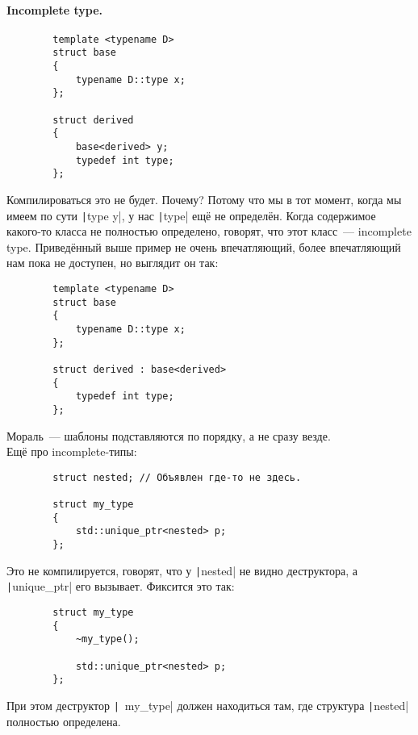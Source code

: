 \documentclass{article}
\begin{document}
    \paragraph{Incomplete type.}
    \begin{verbatim}
        template <typename D>
        struct base
        {
            typename D::type x;
        };

        struct derived
        {
            base<derived> y;
            typedef int type;
        };
    \end{verbatim}
    Компилироваться это не будет. Почему? Потому что мы в тот момент, когда мы имеем по сути \texttt|type y|, у нас \texttt|type| ещё не определён. Когда содержимое какого-то класса не полностью определено, говорят, что этот класс~--- incomplete type. Приведённый выше пример не очень впечатляющий, более впечатляющий нам пока не доступен, но выглядит он так:
    \begin{verbatim}
        template <typename D>
        struct base
        {
            typename D::type x;
        };

        struct derived : base<derived>
        {
            typedef int type;
        };
    \end{verbatim}
    Мораль~--- шаблоны подставляются по порядку, а не сразу везде.\\
    Ещё про incomplete-типы:
    \begin{verbatim}
        struct nested; // Объявлен где-то не здесь.

        struct my_type
        {
            std::unique_ptr<nested> p;
        };
    \end{verbatim}
    Это не компилируется, говорят, что у \texttt|nested| не видно деструктора, а \texttt|unique_ptr| его вызывает. Фиксится это так:
    \begin{verbatim}
        struct my_type
        {
            ~my_type();

            std::unique_ptr<nested> p;
        };
    \end{verbatim}
    При этом деструктор \texttt|~my_type| должен находиться там, где структура \texttt|nested| полностью определена.
\end{document}
